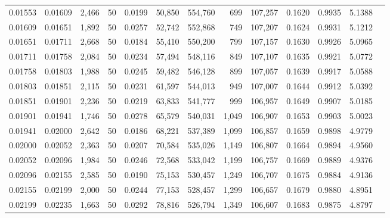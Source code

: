\begin{tabular}{rrrrrrrrrrrrr}
0.01553 & 0.01609 & 2,466 &  50 &                                     0.0199 &  50,850 & 554,760 &     699 & 107,257 & 0.1620 & 0.9935 & 5.1388 \\
0.01609 & 0.01651 & 1,892 &  50 &                                     0.0257 &  52,742 & 552,868 &     749 & 107,207 & 0.1624 & 0.9931 & 5.1212 \\
0.01651 & 0.01711 & 2,668 &  50 &                                     0.0184 &  55,410 & 550,200 &     799 & 107,157 & 0.1630 & 0.9926 & 5.0965 \\
0.01711 & 0.01758 & 2,084 &  50 &                                     0.0234 &  57,494 & 548,116 &     849 & 107,107 & 0.1635 & 0.9921 & 5.0772 \\
0.01758 & 0.01803 & 1,988 &  50 &                                     0.0245 &  59,482 & 546,128 &     899 & 107,057 & 0.1639 & 0.9917 & 5.0588 \\
0.01803 & 0.01851 & 2,115 &  50 &                                     0.0231 &  61,597 & 544,013 &     949 & 107,007 & 0.1644 & 0.9912 & 5.0392 \\
0.01851 & 0.01901 & 2,236 &  50 &                                     0.0219 &  63,833 & 541,777 &     999 & 106,957 & 0.1649 & 0.9907 & 5.0185 \\
0.01901 & 0.01941 & 1,746 &  50 &                                     0.0278 &  65,579 & 540,031 &   1,049 & 106,907 & 0.1653 & 0.9903 & 5.0023 \\
0.01941 & 0.02000 & 2,642 &  50 &                                     0.0186 &  68,221 & 537,389 &   1,099 & 106,857 & 0.1659 & 0.9898 & 4.9779 \\
0.02000 & 0.02052 & 2,363 &  50 &                                     0.0207 &  70,584 & 535,026 &   1,149 & 106,807 & 0.1664 & 0.9894 & 4.9560 \\
0.02052 & 0.02096 & 1,984 &  50 &                                     0.0246 &  72,568 & 533,042 &   1,199 & 106,757 & 0.1669 & 0.9889 & 4.9376 \\
0.02096 & 0.02155 & 2,585 &  50 &                                     0.0190 &  75,153 & 530,457 &   1,249 & 106,707 & 0.1675 & 0.9884 & 4.9136 \\
0.02155 & 0.02199 & 2,000 &  50 &                                     0.0244 &  77,153 & 528,457 &   1,299 & 106,657 & 0.1679 & 0.9880 & 4.8951 \\
0.02199 & 0.02235 & 1,663 &  50 &                                     0.0292 &  78,816 & 526,794 &   1,349 & 106,607 & 0.1683 & 0.9875 & 4.8797 \\

\end{tabular}
